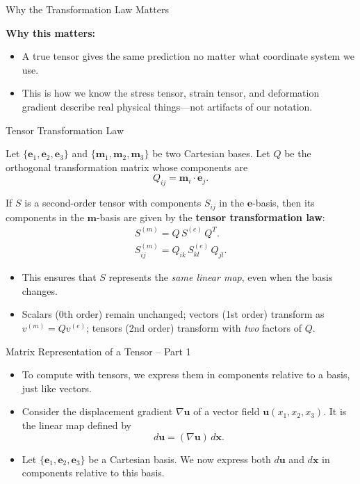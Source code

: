 \documentclass[aspectratio=169,11pt]{beamer}
\begin{document}
\begin{frame}{Why the Transformation Law Matters}

\textbf{Why this matters:}
\begin{itemize}
    \item A true tensor gives the same prediction no matter what coordinate system we use.
    \item This is how we know the stress tensor, strain tensor, and deformation gradient
          describe real physical things—not artifacts of our notation.
\end{itemize}

\end{frame}


\begin{frame}{Tensor Transformation Law}

Let $\{ \mathbf{e}_1, \mathbf{e}_2, \mathbf{e}_3 \}$ and 
$\{ \mathbf{m}_1, \mathbf{m}_2, \mathbf{m}_3 \}$ be two Cartesian bases.
Let $Q$ be the orthogonal transformation matrix whose components are
\[
Q_{ij} = \mathbf{m}_i \cdot \mathbf{e}_j .
\]

\medskip
If $S$ is a second-order tensor with components $S_{ij}$ in the 
$\mathbf{e}$-basis, then its components in the 
$\mathbf{m}$-basis are given by the \textbf{tensor transformation law}:
\begin{gather*}
S^{(m)} = Q\, S^{(e)}\, Q^{T}.
\\
S^{(m)}_{ij}
=
Q_{ik}\, S^{(e)}_{kl}\, Q_{jl}.
\end{gather*}

\medskip
\begin{itemize}
\item This ensures that $S$ represents the \emph{same linear map}, even when the basis changes.
\item Scalars (0th order) remain unchanged; vectors (1st order) transform as $v^{(m)} = Q v^{(e)}$;  
  tensors (2nd order) transform with \emph{two} factors of $Q$.
\end{itemize}

\end{frame}

\begin{frame}{Matrix Representation of a Tensor -- Part 1}

\begin{itemize}

\item To compute with tensors, we express them in components relative to a basis,
just like vectors.

\item Consider the displacement gradient \(\nabla \mathbf{u}\) of a vector field
\(\mathbf{u}(x_1,x_2,x_3)\).  
It is the linear map defined by
\[
d\mathbf{u} = (\nabla \mathbf{u})\, d\mathbf{x}.
\]

\item Let \(\{ \mathbf{e}_1,\mathbf{e}_2,\mathbf{e}_3 \}\) be a Cartesian basis.
We now express both \(d\mathbf{u}\) and \(d\mathbf{x}\) in components relative to this basis.

\end{itemize}

\end{frame}
\end{document}
